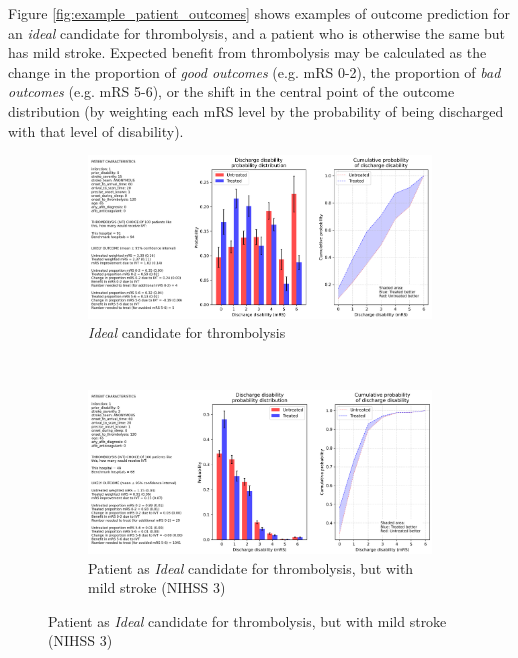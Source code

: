 Figure \ref{fig:example_patient_outcomes} shows examples of outcome prediction for an \textit{ideal} candidate for thrombolysis, and a patient who is otherwise the same but has mild stroke. Expected benefit from thrombolysis may be calculated as the change in the proportion of \textit{good outcomes} (e.g. mRS 0-2), the proportion of \textit{bad outcomes} (e.g. mRS 5-6), or the shift in the central point of the outcome distribution (by weighting each mRS level by the probability of being discharged with that level of disability). 


\begin{figure}[h]
    \centering
    \begin{subfigure}[b]{1.0\textwidth}
        \centering
    \includegraphics[width=1.0\linewidth]{images/prototype_patient_ideal}
        \caption{\textit{Ideal} candidate for thrombolysis}
        \label{fig:patient_outcome_subfig1}
    \end{subfigure}
    \\
    \vspace{8mm}
    \begin{subfigure}[b]{1.0\textwidth}
        \centering
        \includegraphics[width=1.0\linewidth]{images/prototype_patient_mild}
        \caption{Patient as \textit{Ideal} candidate for thrombolysis, but with mild stroke (NIHSS 3)}

\end{subfigure}
\end{figure}
